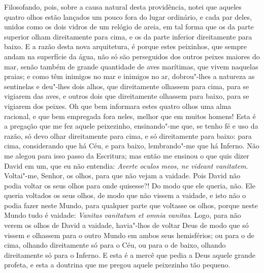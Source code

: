 Filosofando, pois, sobre a causa natural desta providência, notei que
aqueles quatro olhos estão lançados um pouco fora do lugar ordinário, e
cada par deles, unidos como os dois vidros de um relógio de areia, em
tal forma que os da parte superior olham direitamente para cima, e os da
parte inferior direitamente para baixo. E a razão desta nova
arquitetura, é porque estes peixinhos, que sempre andam na superfície da
água, não só são perseguidos dos outros peixes maiores do mar, senão
também de grande quantidade de aves marítimas, que vivem naquelas
praias; e como têm inimigos no mar e inimigos no ar, dobrou"-lhes a
natureza as sentinelas e deu"-lhes dois alhos, que direitamente olhassem
para cima, para se vigiarem das aves, e outros dois que direitamente
olhassem para baixo, para se vigiarem dos peixes.
Oh que bem informara estes quatro olhos uma alma racional, e que bem
empregada fora neles, melhor que em muitos homens! Esta é a pregação que
me fez aquele peixezinho, ensinando"-me que, se tenho fé e uso da razão,
só devo olhar direitamente para cima, e só direitamente para baixo: para
cima, considerando que há Céu, e para baixo, lembrando"-me que há
Inferno. Não me alegou para isso passo da Escritura; mas então me
ensinou o que quis dizer David em um, que eu não entendia: \emph{Averte
oculos meos, ne videant vanitatem}. Voltai"-me, Senhor, os olhos, para
que não vejam a vaidade.
Pois David não podia voltar os seus olhos para onde quisesse?! Do modo
que ele queria, não. Ele queria voltados os seus olhos, de modo que não
vissem a vaidade, e isto não o podia fazer neste Mundo, para qualquer
parte que voltasse os olhos, porque neste Mundo tudo é vaidade:
\emph{Vanitas vanitatum et omnia vanitas}. Logo, para não verem os olhos
de David a vaidade, havia"-lhos de voltar Deus de modo que só vissem e
olhassem para o outro Mundo em ambos seus hemisférios; ou para o de
cima, olhando direitamente só para o Céu, ou para o de baixo, olhando
direitamente só para o Inferno. E esta é a mercê que pedia a Deus aquele
grande profeta, e esta a doutrina que me pregou aquele peixezinho tão
pequeno.

